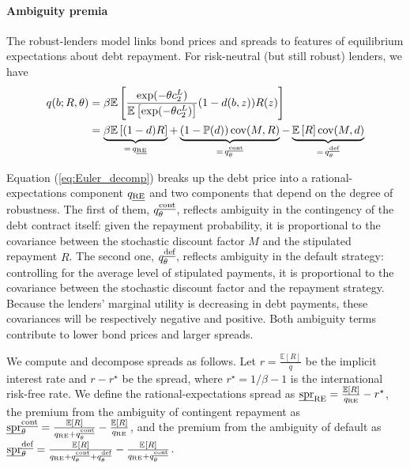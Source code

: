 \paragraph{Ambiguity premia} The robust-lenders model links bond prices and spreads to features of equilibrium expectations about debt repayment. For risk-neutral (but still robust) lenders, we have
\begin{align}\label{eq:Euler_decomp}
  q(b; R, \theta) &= \beta \mathbb{E}\left[ \frac{\exp(-\theta c_2^L)}{\mathbb{E}\left[\exp(-\theta c_2^L)\right]} (1-d(b,z)) R(z) \right] \notag \\
  &= \underbrace{\beta \mathbb{E}\left[(1-d)R\right]}_{=\, q_{\text{\emph{RE}}}} + \underbrace{\left(1-\mathbb{P}(d)\right)\text{cov}{(M,R)}}_{=\, q_\theta^\text{\emph{cont}}} - \underbrace{\mathbb{E}\left[R\right]\text{cov}{(M,d)}}_{=\, q_\theta^\text{\emph{def}}}
\end{align}

Equation (\ref{eq:Euler_decomp}) breaks up the debt price into a rational-expectations component $q_\text{\emph{RE}}$ and two components that depend on the degree of robustness. The first of them, $q_\theta^\text{\emph{cont}}$, reflects ambiguity in the contingency of the debt contract itself: given the repayment probability, it is proportional to the covariance between the stochastic discount factor $M$ and the stipulated repayment $R$. The second one, $q_\theta^\text{\emph{def}}$, reflects ambiguity in the default strategy: controlling for the average level of stipulated payments, it is proportional to the covariance between the stochastic discount factor and the repayment strategy. Because the lenders' marginal utility is decreasing in debt payments, these covariances will be respectively negative and positive. Both ambiguity terms contribute to lower bond prices and larger spreads.

We compute and decompose spreads as follows. Let $r = \frac{\mathbb{E}[R]}{q}$ be the implicit interest rate and $r-r^\star$ be the spread, where $r^\star = 1/\beta - 1$ is the international risk-free rate. We define the rational-expectations spread as $\text{\emph{spr}}_\text{RE} = \frac{\mathbb{E}[R]}{q_\text{RE}} - r^\star$, the premium from the ambiguity of contingent repayment as $\text{\emph{spr}}_\theta^\text{\emph{cont}} = \frac{\mathbb{E}[R]}{q_\text{RE} + q_\theta^\text{\emph{cont}}} - \frac{\mathbb{E}[R]}{q_\text{RE}}$, and the premium from the ambiguity of default as $\text{\emph{spr}}_\theta^\text{\emph{def}} = \frac{\mathbb{E}_{{}}\left[ R \right]}{q_\text{RE}+q_\theta^\text{\emph{cont}}+q_\theta^\text{\emph{def}}} - \frac{\mathbb{E}_{{}}\left[ R \right]}{q_\text{RE}+q_\theta^\text{\emph{cont}}}$.

